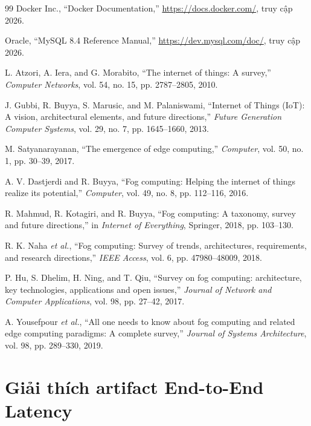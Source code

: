\documentclass[13pt,a4paper]{report}
\begin{document}
\begin{thebibliography}{99}
 Docker Inc., ``Docker Documentation,''
\url{https://docs.docker.com/}, truy cập 2026.

 Oracle, ``MySQL 8.4 Reference Manual,''
\url{https://dev.mysql.com/doc/}, truy cập 2026.

 L. Atzori, A. Iera, and G. Morabito, ``The internet of
things: A survey,'' \textit{Computer Networks}, vol. 54, no. 15,
pp. 2787--2805, 2010.

 J. Gubbi, R. Buyya, S. Marusic, and M. Palaniswami,
``Internet of Things (IoT): A vision, architectural elements, and future
directions,'' \textit{Future Generation Computer Systems}, vol. 29, no. 7,
pp. 1645--1660, 2013.

 M. Satyanarayanan, ``The emergence of edge
computing,'' \textit{Computer}, vol. 50, no. 1, pp. 30--39, 2017.

 A. V. Dastjerdi and R. Buyya, ``Fog computing: Helping
the internet of things realize its potential,'' \textit{Computer}, vol. 49,
no. 8, pp. 112--116, 2016.

 R. Mahmud, R. Kotagiri, and R. Buyya, ``Fog computing: A
taxonomy, survey and future directions,'' in \textit{Internet of Everything},
Springer, 2018, pp. 103--130.

 R. K. Naha \textit{et al.}, ``Fog computing: Survey of trends,
architectures, requirements, and research directions,'' \textit{IEEE Access},
vol. 6, pp. 47980--48009, 2018.

 P. Hu, S. Dhelim, H. Ning, and T. Qiu, ``Survey on fog
computing: architecture, key technologies, applications and open issues,''
\textit{Journal of Network and Computer Applications}, vol. 98, pp. 27--42, 2017.

 A. Yousefpour \textit{et al.}, ``All one needs to know
about fog computing and related edge computing paradigms: A complete survey,''
\textit{Journal of Systems Architecture}, vol. 98, pp. 289--330, 2019.

\end{thebibliography}

\appendix
{}

\chapter{Giải thích artifact End-to-End Latency}
\label{app:artifact}
\end{document}
